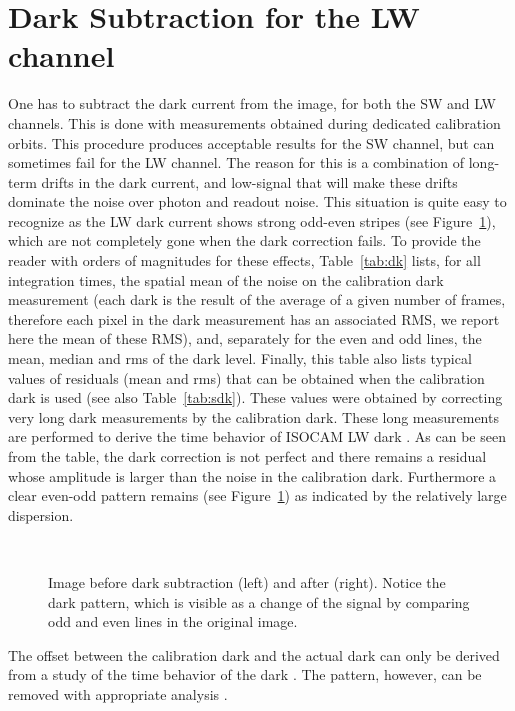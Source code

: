 
\section{Dark Subtraction for the LW channel}
\label{sect_dark}
One has to subtract the dark current from the image,   
for both the SW and LW channels. This is done with measurements obtained
during dedicated calibration orbits. This procedure produces
acceptable results for the SW channel, but can sometimes fail for the
LW channel. The reason for this is a combination of long-term drifts in the
dark current, and low-signal that will make these drifts dominate the
noise over photon and readout noise. This situation is quite easy to
recognize as the LW dark current shows strong odd-even stripes (see
Figure~\ref{fig_dark}), which are not completely gone when the dark
correction fails. To provide the reader with orders of magnitudes for
these effects, Table~\ref{tab:dk} lists, for all integration times,
the spatial mean of the noise on the calibration dark measurement
(each dark is the result of the average of a given number of frames,
therefore each pixel in the dark measurement has an associated RMS,
we report here the mean of these RMS), and, separately
for the even and odd lines, the mean, median and rms of the dark
level. Finally, this table also lists typical values of residuals (mean
and rms) that can be obtained when the calibration dark is used (see
also Table~\ref{tab:sdk}). These values were obtained by correcting
very long dark measurements by the calibration dark. These long
measurements are performed to derive the time behavior of ISOCAM LW
dark \cite{iso:biviano98}. As can be seen from the table, the dark
correction is not perfect and there remains a residual whose amplitude
is larger than the noise in the calibration dark. Furthermore a clear
even-odd pattern remains (see Figure~\ref{fig_dark}) as indicated by
the relatively large dispersion.

\begin{figure}[htb]
\centerline{
\hbox{
}}
\caption{Image before dark subtraction (left) and after (right). Notice 
the dark pattern, which is visible as a change of the signal by comparing
odd and even lines in the original image.}
\label{fig_dark}
\end{figure}

The offset between the calibration dark and the actual dark can only
be derived from a study of the time behavior of the dark \cite{iso:biviano98}. 
The pattern, however, can be removed with appropriate
analysis \cite{iso:bure96,starck:tr_dark96}.

